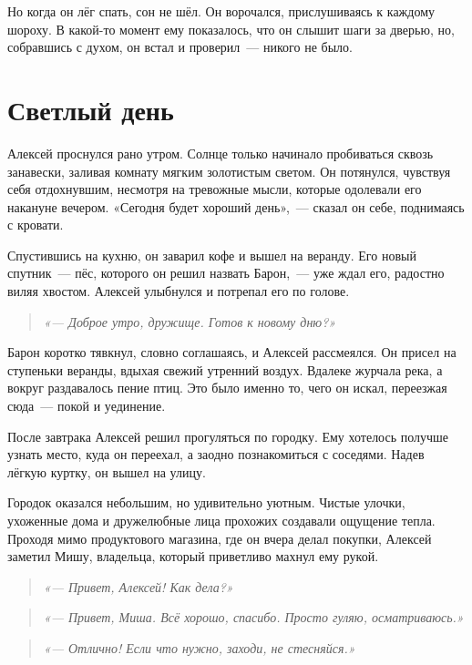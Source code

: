 \documentclass[12pt,a4paper]{book}
\newenvironment{dialogue}{\begin{quote}\itshape}{\end{quote}} %
\begin{document}
Но когда он лёг спать, сон не шёл. Он ворочался, прислушиваясь к каждому шороху. В какой-то момент ему показалось, что он слышит шаги за дверью, но, собравшись с духом, он встал и проверил~--- никого не было.

\chapter{Светлый день}

Алексей проснулся рано утром. Солнце только начинало пробиваться сквозь занавески, заливая комнату мягким золотистым светом. Он потянулся, чувствуя себя отдохнувшим, несмотря на тревожные мысли, которые одолевали его накануне вечером. «Сегодня будет хороший день»,~--- сказал он себе, поднимаясь с кровати.

Спустившись на кухню, он заварил кофе и вышел на веранду. Его новый спутник~--- пёс, которого он решил назвать Барон,~--- уже ждал его, радостно виляя хвостом. Алексей улыбнулся и потрепал его по голове.

\begin{dialogue}
«--- Доброе утро, дружище. Готов к новому дню?»
\end{dialogue}

Барон коротко тявкнул, словно соглашаясь, и Алексей рассмеялся. Он присел на ступеньки веранды, вдыхая свежий утренний воздух. Вдалеке журчала река, а вокруг раздавалось пение птиц. Это было именно то, чего он искал, переезжая сюда~--- покой и уединение.

После завтрака Алексей решил прогуляться по городку. Ему хотелось получше узнать место, куда он переехал, а заодно познакомиться с соседями. Надев лёгкую куртку, он вышел на улицу.

Городок оказался небольшим, но удивительно уютным. Чистые улочки, ухоженные дома и дружелюбные лица прохожих создавали ощущение тепла. Проходя мимо продуктового магазина, где он вчера делал покупки, Алексей заметил Мишу, владельца, который приветливо махнул ему рукой.

\begin{dialogue}
«--- Привет, Алексей! Как дела?»
\end{dialogue}

\begin{dialogue}
«--- Привет, Миша. Всё хорошо, спасибо. Просто гуляю, осматриваюсь.»
\end{dialogue}

\begin{dialogue}
«--- Отлично! Если что нужно, заходи, не стесняйся.»
\end{dialogue}
\end{document}
